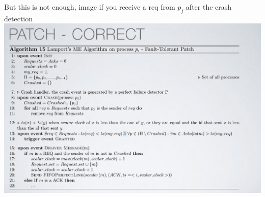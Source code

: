 \documentclass[11pt, a4paper]{article}
\begin{document}
\begin{center}
    But this is not enough, image if you receive a req from $p_j$ after the crash detection
    \includegraphics[scale=0.5]{img/LE/Me-Correct.png}
\end{center}
\end{document}

